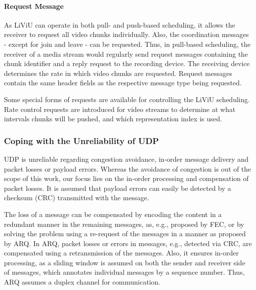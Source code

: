 \paragraph{Request Message}
As \ac{LiViU} can operate in both pull- and push-based scheduling, it allows the receiver to request all video chunks individually.
Also, the coordination messages - except for join and leave - can be requested.
Thus, in pull-based scheduling, the receiver of a media stream would regularly send request messages containing the chunk identifier and a reply request to the recording device.
The receiving device determines the rate in which video chunks are requested. Request messages contain the same header fields as the respective message type being requested.

Some special forms of requests are available for controlling the \ac{LiViU} scheduling. 
Rate control requests are introduced for video streams to determine at what intervals chunks will be pushed, and which representation index is used. 
\subsubsection{Coping with the Unreliability of UDP}
\label{sec:522_CopingUnreliabilityUDP}
\ac{UDP} is unreliable regarding congestion avoidance, in-order message delivery and packet losses or payload errors.
Whereas the avoidance of congestion is out of the scope of this work, our focus lies on the in-order processing and compensation of packet losses.
It is assumed that payload errors can easily be detected by a checksum (\ac{CRC}) transmitted with the message.

The loss of a message can be compensated by encoding the content in a redundant manner in the remaining messages, as, e.g., proposed by \ac{FEC}, or by solving the problem using a re-request of the messages in a manner as proposed by \ac{ARQ}.
In \ac{ARQ}, packet losses or errors in messages, e.g., detected via \ac{CRC}, are compensated using a retransmission of the messages.
Also, it ensures in-order processing, as a sliding window is assumed on both the sender and receiver side of messages, which annotates individual messages by a sequence number.
Thus, \ac{ARQ} assumes a duplex channel for communication.

